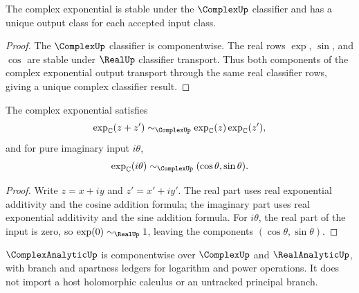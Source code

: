 \begin{theorem}
\label{thm:analysis-spine-complex-exp-stability}
The complex exponential is stable under the $\ComplexUp$ classifier and has a
unique output class for each accepted input class.
\end{theorem}

\begin{proof}
The $\ComplexUp$ classifier is componentwise.  The real rows
$\exp$, $\sin$, and $\cos$ are stable under $\RealUp$ classifier transport.
Thus both components of the complex exponential output transport through the
same real classifier rows, giving a unique complex classifier result.
\end{proof}

\begin{theorem}
\label{thm:analysis-spine-complex-exp-additivity-euler}
The complex exponential satisfies
$$
\exp_{\mathbb C}(z+z')
\sim_{\ComplexUp}
\exp_{\mathbb C}(z)\exp_{\mathbb C}(z'),
$$
and for pure imaginary input $i\theta$,
$$
\exp_{\mathbb C}(i\theta)
\sim_{\ComplexUp}
(\cos\theta,\sin\theta).
$$
\end{theorem}

\begin{proof}
Write $z=x+i y$ and $z'=x'+i y'$.  The real part uses real exponential
additivity and the cosine addition formula; the imaginary part uses real
exponential additivity and the sine addition formula.  For $i\theta$, the
real part of the input is zero, so $\exp(0)\sim_{\RealUp}1$, leaving the
components $(\cos\theta,\sin\theta)$.
\end{proof}

\begin{principle}
\label{prin:analysis-spine-complex-analytic-boundary}
$\ComplexAnalyticUp$ is componentwise over $\ComplexUp$ and
$\RealAnalyticUp$, with branch and apartness ledgers for logarithm and power
operations.  It does not import a host holomorphic calculus or an untracked
principal branch.
\end{principle}


